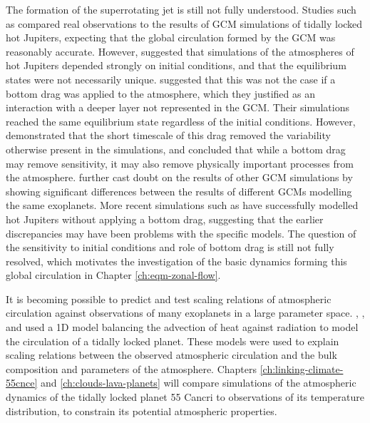 The formation of the superrotating jet is still not fully understood. Studies such as \citet{kataria2015atmospheric} compared real observations to the results of GCM simulations of tidally locked hot Jupiters, expecting that the global circulation formed by the GCM was reasonably accurate. However, \citet{thrastarson2010effects} suggested that simulations of the atmospheres of hot Jupiters depended strongly on initial conditions, and that the equilibrium states were not necessarily unique. \citet{liu2013atmospheric} suggested that this was not the case if a bottom drag was applied to the atmosphere, which they justified as an interaction with a deeper layer not represented in the GCM. Their simulations reached the same equilibrium state regardless of the initial conditions. However, \citet{cho2015sensitivity} demonstrated that the short timescale of this drag removed the variability otherwise present in the simulations, and concluded that while a bottom drag may remove sensitivity, it may also remove physically important processes from the atmosphere. \citet{polichtchouk2014intercomparison} further cast doubt on the results of other GCM simulations by showing significant differences between the results of different GCMs modelling the same exoplanets. More recent simulations such as \citet{mendoncca2016thor} have successfully modelled hot Jupiters without applying a bottom drag, suggesting that the earlier discrepancies may have been problems with the specific models. The question of the sensitivity to initial conditions and role of bottom drag is still not fully resolved, which motivates the investigation of the basic dynamics forming this global circulation in Chapter \ref{ch:eqm-zonal-flow}.

It is becoming possible to predict and test scaling relations of atmospheric circulation against observations of many exoplanets in a large parameter space. \citet{komacek2016daynightI}, \citet{komacek2017daynightII}, and \citet{zhang2017dynamics} used a 1D model balancing the advection of heat against radiation to model the circulation of a tidally locked planet. These models were used to explain scaling relations between the observed atmospheric circulation and the bulk composition and parameters of the atmosphere. Chapters \ref{ch:linking-climate-55cnce} and \ref{ch:clouds-lava-planets} will compare simulations of the atmospheric dynamics of the tidally locked planet 55 Cancri to observations of its temperature distribution, to constrain its potential atmospheric properties.












